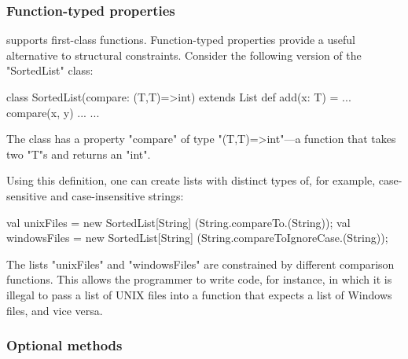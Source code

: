
\subsubsection{Function-typed properties}

\Xten{} supports first-class functions.
Function-typed properties provide a useful alternative to
structural constraints.
Consider the following version of the
\xcd"SortedList" class:
{\footnotesize
\begin{xten}
class SortedList(compare: (T,T)=>int) extends List {
    def add(x: T) = { ... compare(x, y) ... }
    ...
}
\end{xten}}
\noindent
The class has a property \xcd"compare" of type
\xcd"(T,T)=>int"---a function that takes two \xcd"T"s and
returns an \xcd"int".  

Using this definition, one can create lists with distinct types
of, for example, case-sensitive and case-insensitive strings:
{\footnotesize\begin{xten}
val unixFiles
  = new SortedList[String]
        (String.compareTo.(String));
val windowsFiles
  = new SortedList[String]
        (String.compareToIgnoreCase.(String));
\end{xten}}

\noindent
The lists \xcd"unixFiles" and \xcd"windowsFiles" are constrained
by different comparison functions.  This allows the programmer
to write code, for instance, in which it is illegal to pass a list of UNIX
files into a function that expects a list of Windows files, and
vice versa.

\subsubsection{Optional methods}

